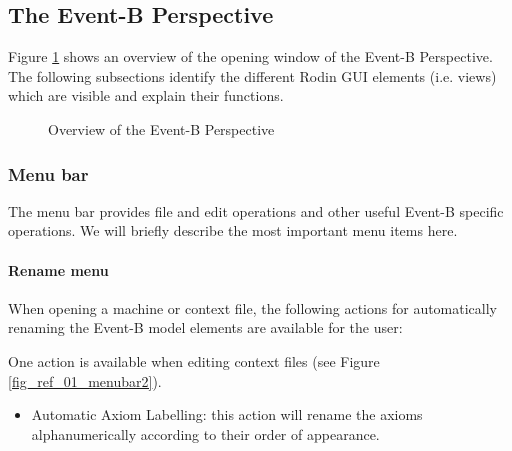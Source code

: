 

\subsection{The Event-B Perspective}
\label{event_b_perspective}

Figure \ref{fig_ref_01_eventb_perspective1} shows an overview of the opening window of the Event-B Perspective. The following subsections identify the different Rodin GUI elements (i.e. views) which are visible and explain their functions.

\ifinprint
\begin{figure}
  \begin{center}
    \caption{Overview of the Event-B Perspective}
    \label{fig_ref_01_eventb_perspective1}
  \end{center}
\end{figure}
\else
{}
\fi

\subsubsection{Menu bar}
\label{menu_bar}

The menu bar provides file and edit operations and other useful Event-B specific operations. We will briefly describe the most important menu items here.

\paragraph{Rename menu}

When opening a machine or context file, the following actions for automatically renaming the Event-B model elements are available for the user:

One action is available when editing context files (see Figure \ref{fig_ref_01_menubar2}).

    \begin{itemize}
    	\item Automatic Axiom Labelling: this action will rename the axioms alphanumerically according to their order of appearance. 
    \end{itemize}

